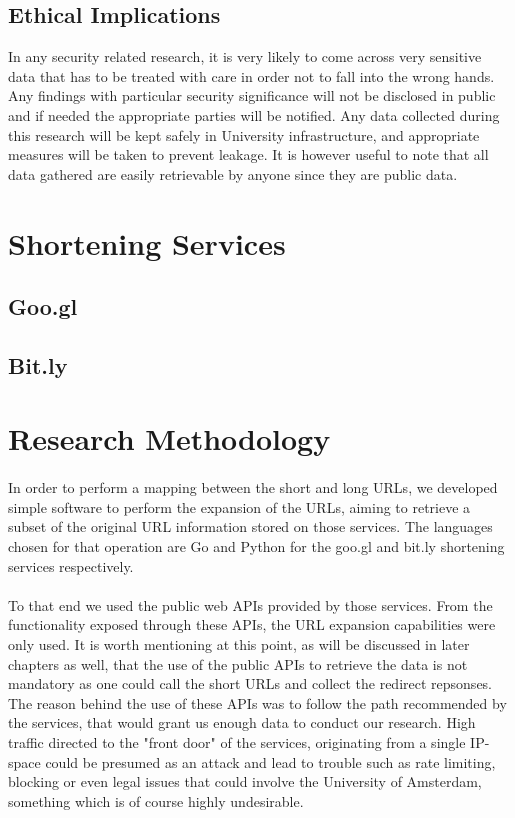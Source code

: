 \documentclass[12pt]{article}
\begin{document}
\subsection{Ethical Implications}
In any security related research, it is very likely to come across very sensitive data that has to be treated with care in order not to fall into the wrong hands. Any findings with particular security significance will not be disclosed in public and if needed the appropriate parties will be notified. Any data collected during this research will be kept safely in University infrastructure, and appropriate measures will be taken to prevent leakage. It is however useful to note that all data gathered are easily retrievable by anyone since they are public data.
\newpage
\section{Shortening Services}

\subsection{Goo.gl}

\subsection{Bit.ly}
	
\section{Research Methodology}

\paragraph{}
In order to perform a mapping between the short and long URLs, we developed simple software to perform the expansion of the URLs, aiming to retrieve a subset of the original URL information stored on those services. The languages chosen for that operation are Go and Python for the goo.gl and bit.ly shortening services respectively. 

\paragraph{}
To that end we used the public web APIs provided by those services. From the functionality exposed through these APIs, the URL expansion capabilities were only used. It is worth mentioning at this point, as will be discussed in later chapters as well, that the use of the public APIs to retrieve the data is not mandatory as one could call the short URLs and collect the redirect repsonses. The reason behind the use of these APIs was to follow the path recommended by the services, that would grant us enough data to conduct our research. High traffic directed to the "front door" of the services, originating from a single IP-space could be presumed as an attack and lead to trouble such as rate limiting, blocking or even legal issues that could involve the University of Amsterdam, something which is of course highly undesirable. 
\end{document}
